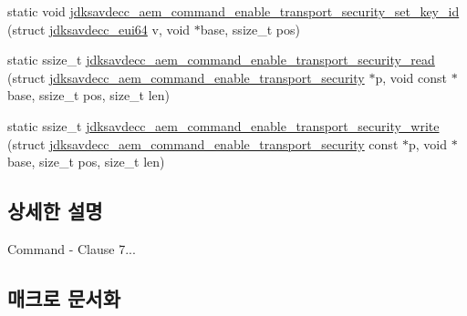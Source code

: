 \begin{DoxyCompactItemize}
static void \hyperlink{group__command__enable__transport__security_ga8a89dd4d54836be33b4bbe6c4eebdc1f}{jdksavdecc\+\_\+aem\+\_\+command\+\_\+enable\+\_\+transport\+\_\+security\+\_\+set\+\_\+key\+\_\+id} (struct \hyperlink{structjdksavdecc__eui64}{jdksavdecc\+\_\+eui64} v, void $\ast$base, ssize\+\_\+t pos)
\item 
static ssize\+\_\+t \hyperlink{group__command__enable__transport__security_ga53befabf9989d283a7bcc71801809401}{jdksavdecc\+\_\+aem\+\_\+command\+\_\+enable\+\_\+transport\+\_\+security\+\_\+read} (struct \hyperlink{structjdksavdecc__aem__command__enable__transport__security}{jdksavdecc\+\_\+aem\+\_\+command\+\_\+enable\+\_\+transport\+\_\+security} $\ast$p, void const $\ast$base, ssize\+\_\+t pos, size\+\_\+t len)
\item 
static ssize\+\_\+t \hyperlink{group__command__enable__transport__security_ga602cd36856a501c3e1f6234b78f5dd96}{jdksavdecc\+\_\+aem\+\_\+command\+\_\+enable\+\_\+transport\+\_\+security\+\_\+write} (struct \hyperlink{structjdksavdecc__aem__command__enable__transport__security}{jdksavdecc\+\_\+aem\+\_\+command\+\_\+enable\+\_\+transport\+\_\+security} const $\ast$p, void $\ast$base, size\+\_\+t pos, size\+\_\+t len)
\end{DoxyCompactItemize}


\subsection{상세한 설명}
Command -\/ Clause 7... 

\subsection{매크로 문서화}
